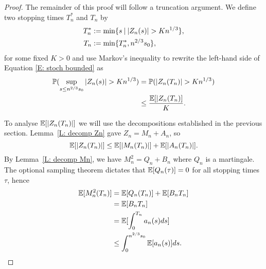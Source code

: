 \begin{proof}
    The remainder of this proof will follow a truncation argument.
    We define two stopping times $T^*_n$ and $T_n$ by
    \begin{align} 
    T^*_n &:= \min \lbrace s \: | \: |Z_n(s)| > K n^{1 / 3} \rbrace, \label{E: def T*n} \\
    T_n &:= \min \lbrace T^*_n, n^{2 / 3}s_0 \rbrace ,  \label{E: def Tn}
    \end{align}
    for some fixed $K>0$ and use Markov's inequality to rewrite the left-hand side of Equation \eqref{E: stoch bounded} as
    \begin{equation} \label{E: stoch bounded 2}
    \begin{aligned}
    \mathbb{P}( \sup_{s\leq n^{2/3} s_0} |Z_n(s)| > K n^{1 / 3} ) &= \mathbb{P}( |Z_n(T_n)| > Kn^{1 / 3} ) \\
    &\leq \frac{\mathbb{E}[|Z_n(T_n)]}{K}.
    \end{aligned} 
    \end{equation}
    
    To analyse $\mathbb{E}[|Z_n(T_n)|]$ we will use the decompositions established in the previous section. 
    Lemma~\ref{L: decomp Zn} gave $Z_n = M_n + A_n$,
    so \begin{equation} \label{E: Exp(|Zn|)}
    \mathbb{E}[|Z_n(T_n)|] \leq \mathbb{E}[|M_n(T_n)|] + \mathbb{E}[|A_n(T_n)|].
    \end{equation}
    By Lemma~\ref{L: decomp Mn}, we have $M^2_n = Q_n + B_n$ where $Q_n$ is a martingale. 
    The optional sampling theorem dictates that 
    $\mathbb{E}[Q_n(\tau)] = 0$ 
    for all stopping times $\tau$, hence 
    \begin{align*}
    \mathbb{E}[M^2_n(T_n)] 
    &= \mathbb{E}[Q_n(T_n)] + \mathbb{E}[B_n{T_n}] \\
    &= \mathbb{E}[B_n{T_n}] \\
    &= \mathbb{E}[ \int_{0}^{T_n} a_n(s)ds ] \\
    &\leq \int_{0}^{n^{2 / 3}s_0} \mathbb{E}[a_n(s)] ds.
    \end{align*}
    

\end{proof}
